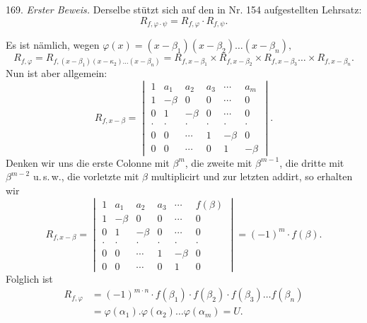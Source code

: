 \documentclass[11pt]{article}
\providecommand{\weberpage}[1]{}
\begin{document}
169. \textit{Erster Beweis.} Derselbe stützt sich auf den in Nr. 154
aufgestellten Lehrsatz:
\[
R_{f,\varphi \cdot \psi} = R_{f,\varphi} \cdot R_{f,\psi}.
\]


\weberpage{181}
Es ist nämlich, wegen $\varphi(x) = (x - \beta_1)(x - \beta_2) \ldots (x - \beta_n),$
\[
R_{f,\varphi} = R_{f,(x-\beta_1)(x-\kappa_2)\ldots(x-\beta_n)} = R_{f,x-\beta_1} \times R_{f,x-\beta_2} \times R_{f,x-\beta_3} \ldots \times R_{f,x-\beta_n}. %
\]
Nun ist aber allgemein:
\[
R_{f,x-\beta} =
\begin{vmatrix}
1 & a_1 & a_2 & a_3 & \cdots & a_m \\
1 & -\beta & 0 & 0 & \cdots & 0 \\
0 & 1 & -\beta & 0 & \cdots & 0 \\
\cdot & \cdot & \cdot & \cdot & \cdot & \cdot \\
0 & 0 & \cdots & 1 & -\beta & 0 \\
0 & 0 & \cdots & 0 & 1 & -\beta
\end{vmatrix}.
\]
Denken wir uns die erste Colonne mit $\beta^m$, die zweite mit
$\beta^{m-1}$, die dritte mit $\beta^{m-2}$ u.\,s.\,w., die vorletzte mit
$\beta$ multiplicirt und zur letzten addirt, so erhalten wir
\[
R_{f,x-\beta} =
\begin{vmatrix}
1 & a_1 & a_2 & a_3 & \cdots & f(\beta) \\
1 & -\beta & 0 & 0 & \cdots & 0 \\
0 & 1 & -\beta & 0 & \cdots & 0 \\
\cdot & \cdot & \cdot & \cdot & \cdot & \cdot \\
0 & 0 & \cdots & 1 & -\beta & 0 \\
0 & 0 & \cdots & 0 & 1 & 0
\end{vmatrix}
= (-1)^m \cdot f(\beta).
\]
Folglich ist
\[
\begin{aligned}
R_{f,\varphi} &= (-1)^{m \cdot n} \cdot f(\beta_1) \cdot f(\beta_2) \cdot f(\beta_3) \ldots f(\beta_n) \\
&= \varphi(\alpha_1) . \varphi(\alpha_2) \ldots \varphi(\alpha_m) = U.
\end{aligned}
\]
\end{document}
